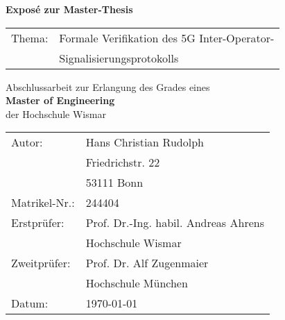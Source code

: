 \begin{titlepage}
\centering

\vspace*{3cm}

{
    \Huge{
        \textbf{Exposé zur Master-Thesis}
    }
}

\vspace{2cm}

\begin{table}[h!]
\centering
\LARGE
\begin{tabular}{ll}
Thema:         & Formale Verifikation des 5G Inter-Operator-\\
               & Signalisierungsprotokolls
\end{tabular}
\end{table}

\vspace{2cm}

\large{
    Abschlussarbeit zur Erlangung des Grades eines\\\vspace{2mm}
    \textbf{Master of Engineering}\\\vspace{2mm}
    der Hochschule Wismar
}

\vfill

\begin{table}[h!]
\centering
\large
\begin{tabular}{ll}
Autor:         & Hans Christian Rudolph               \\
               & Friedrichstr. 22                     \\
               & 53111 Bonn                           \\\vspace{3mm}
Matrikel-Nr.:  & 244404\\
Erstprüfer:    & Prof. Dr.-Ing. habil. Andreas Ahrens \\
               & Hochschule Wismar                    \\
Zweitprüfer:   & Prof. Dr. Alf Zugenmaier             \\\vspace{3mm}
               & Hochschule München                   \\
Datum:         & \today                             
\end{tabular}
\end{table}

\vspace{2cm}

\end{titlepage}